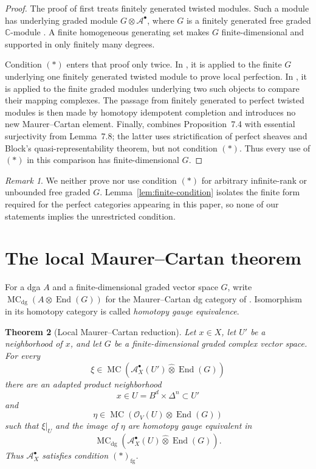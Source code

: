 \documentclass[12pt]{amsart}
\newtheorem{thm}{Theorem}[section]
\theoremstyle{definition}
\theoremstyle{remark}
\newtheorem{rem}[thm]{Remark}
\numberwithin{equation}{section}
\newcommand{\CA}{\mathcal A}
\newcommand{\CO}{\mathcal O}
\newcommand{\C}{\mathbb C}
\newcommand{\MC}{\operatorname{MC}}
\newcommand{\End}{\operatorname{End}}
\begin{document}
\begin{proof}
The proof of \cite[Proposition~7.4]{CHL2021} first treats finitely generated
twisted modules.  Such a module has underlying graded module
\(G\otimes\CA^\bullet\), where \(G\) is a finitely generated free graded
\(\C\)-module \cite[Definition~3.1]{CHL2021}.  A finite homogeneous
generating set makes \(G\) finite-dimensional and supported in only finitely
many degrees.

Condition \({(*)}\) enters that proof only twice.  In
\cite[Lemma~7.5]{CHL2021}, it is applied to the finite \(G\) underlying one
finitely generated twisted module to prove local perfection.  In
\cite[Lemma~7.6]{CHL2021}, it is applied to the finite graded modules
underlying two such objects to compare their mapping complexes.  The passage
from finitely generated to perfect twisted modules is then made by homotopy
idempotent completion and introduces no new Maurer--Cartan element.
Finally, \cite[Theorem~7.10]{CHL2021} combines Proposition~7.4 with essential
surjectivity from Lemma~7.8; the latter uses strictification of perfect
sheaves and Block's quasi-representability theorem, but not condition
\({(*)}\).  Thus every use of \({(*)}\) in this comparison has
finite-dimensional \(G\).
\end{proof}

\begin{rem}\label{rem:infinite-G}
We neither prove nor use condition \({(*)}\) for arbitrary infinite-rank or
unbounded free graded \(G\).  Lemma~\ref{lem:finite-condition} isolates the
finite form required for the perfect categories appearing in this paper, so
none of our statements implies the unrestricted condition.
\end{rem}

\section{The local Maurer--Cartan theorem}\label{sec:local-mc}

For a dga \(A\) and a finite-dimensional graded vector space \(G\), write
\(\MC_{\mathrm{dg}}(A\otimes\End(G))\) for the Maurer--Cartan dg category of
\cite[Section~2]{CHL2021}.  Isomorphism in its homotopy category is called
\emph{homotopy gauge equivalence}.

\begin{thm}[Local Maurer--Cartan reduction]\label{thm:local-mc}
Let \(x\in X\), let \(U'\) be a neighborhood of \(x\), and let \(G\) be a
finite-dimensional graded complex vector space.  For every
\[
\xi\in
\MC\!\left(
\CA_X^\bullet(U')\widehat\otimes\End(G)
\right)
\]
there are an adapted product neighborhood
\[
x\in U=B^d\times\Delta^n\subset U'
\]
and
\[
\eta\in
\MC\!\left(
\CO_V(U)\otimes\End(G)
\right)
\]
such that \(\xi|_U\) and the image of \(\eta\) are homotopy gauge equivalent
in
\[
\MC_{\mathrm{dg}}\!\left(
\CA_X^\bullet(U)\widehat\otimes\End(G)
\right).
\]
Thus \(\CA_X^\bullet\) satisfies condition
\({(*)}_{\mathrm{fg}}\).
\end{thm}
\end{document}
